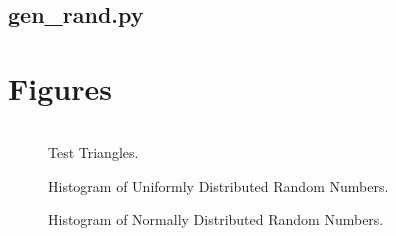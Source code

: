 \documentclass{article}
\begin{document}
\subsection{gen\_rand.py}

\clearpage %

\section{Figures}

\begin{figure}[ht!]
\begin{center}
\begin{tabular}{cc}
\end{tabular}
\end{center}
\caption{Test Triangles.}
\end{figure}
\pagebreak

\begin{figure}[ht!]
\begin{center}
\caption{Histogram of Uniformly Distributed Random Numbers.}
\end{center}
\end{figure}

\begin{figure}[ht!]
\begin{center}
\caption{Histogram of Normally Distributed Random Numbers.}
\end{center}
\end{figure}
\end{document}
